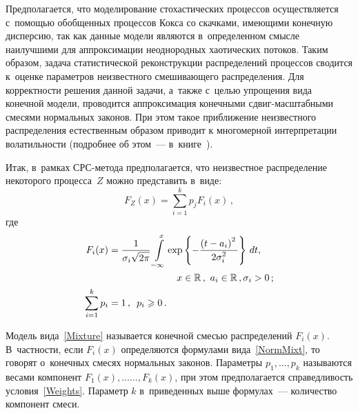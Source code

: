 \begin{multicols}{2}
Предполагается, что моделирование стохастических процессов осуществляется
с~помощью обобщенных
процессов Кокса со скачками, имеющими конечную дисперсию, так как данные модели являются в~определенном смысле наилучшими для аппроксимации неоднородных хаотических потоков. Таким образом,
задача статистической реконструкции распределений процессов сводится к~оценке параметров неизвестного
смешивающего распределения. Для корректности решения данной задачи,
а~также с~целью упрощения вида
конечной модели, проводится аппроксимация конечными
сдвиг-мас\-штаб\-ны\-ми смесями нормальных законов. При этом такое приближение неизвестного распределения
естественным образом приводит к многомерной интерпретации волатильности (подробнее об этом~---
в~книге~\cite{Korolev2011}).

Итак, в~рамках СРС-метода предполагается, что неизвестное распределение
некоторого процесса~$Z$ можно представить в~виде:
\begin{equation}
F_Z(x)=\sum\limits_{i=1}^kp_j F_i(x)\,, \label{Mixture}
\end{equation}
где
\begin{align}
\hspace*{-5mm}F_i(x)&=\fr{1}{\sigma_i\sqrt{2\pi}}\int\limits_{-\infty}^{x}\exp
\left\{-\fr{\left(t-a_i\right)^2}{2\sigma_i^2}\right\}\,dt, \notag\\
& \hspace*{25mm}x\in\R\,,\ a_i\in\R\,,  \sigma_i>0\,; \label{NormMixt}\\
\sum\limits_{i=1}^{k}p_{i}&=1\,,\enskip p_{i}\geqslant 0\,.
\label{Weights}
\end{align}

Модель вида~\eqref{Mixture} называется конечной смесью распределений $F_i(x)$.
В~частности, если
$F_i(x)$ определяются формулами вида~\eqref{NormMixt}, то говорят о~{конечных смесях нормальных
законов}. Параметры  $p_{1},\ldots,p_{k}$ называются {весами} компонент
$F_{1}(x),\ldots$\linebreak $\ldots,F_{k}(x)$, при этом предполагается справедливость условия~\eqref{Weights}. Параметр
$k$ в~приведенных выше формулах~--- количество компонент смеси.


\end{multicols}
